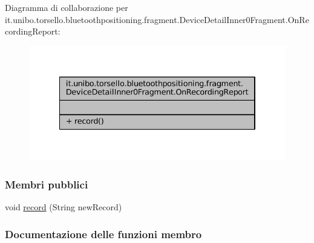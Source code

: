 Diagramma di collaborazione per it.\+unibo.\+torsello.\+bluetoothpositioning.\+fragment.\+Device\+Detail\+Inner0\+Fragment.\+On\+Recording\+Report\+:
\nopagebreak
\begin{figure}[H]
\begin{center}
\leavevmode
\includegraphics[width=334pt]{interfaceit_1_1unibo_1_1torsello_1_1bluetoothpositioning_1_1fragment_1_1DeviceDetailInner0Fragme10bd69251886d8905e7bf739086755ab}
\end{center}
\end{figure}
\subsubsection*{Membri pubblici}
\begin{DoxyCompactItemize}
\item 
void \hyperlink{interfaceit_1_1unibo_1_1torsello_1_1bluetoothpositioning_1_1fragment_1_1DeviceDetailInner0Fragment_1_1OnRecordingReport_a63fd189046ae9d716c19b152957f6c74_a63fd189046ae9d716c19b152957f6c74}{record} (String new\+Record)
\end{DoxyCompactItemize}


\subsubsection{Documentazione delle funzioni membro}
\hypertarget{interfaceit_1_1unibo_1_1torsello_1_1bluetoothpositioning_1_1fragment_1_1DeviceDetailInner0Fragment_1_1OnRecordingReport_a63fd189046ae9d716c19b152957f6c74_a63fd189046ae9d716c19b152957f6c74}{}\label{interfaceit_1_1unibo_1_1torsello_1_1bluetoothpositioning_1_1fragment_1_1DeviceDetailInner0Fragment_1_1OnRecordingReport_a63fd189046ae9d716c19b152957f6c74_a63fd189046ae9d716c19b152957f6c74} 
